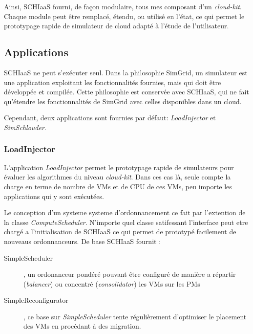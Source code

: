 \documentclass[parallelisme]{compas2017}
\begin{document}
Ainsi, SCHIaaS fourni, de façon modulaire, tous mes composant d'un \textit{cloud-kit}. 
Chaque module peut être remplacé, étendu, ou utilisé en l'état, ce qui permet le prototypage
rapide de simulateur de cloud adapté à l'étude de l'utilisateur.

\subsection{Applications}

SCHIaaS ne peut s'exécuter seul. Dans la philosophie SimGrid, un simulateur est une application
exploitant les fonctionnalités fournies, mais qui doit être développée et compilée.
Cette philosophie est conservée avec SCHIaaS, qui ne fait qu'étendre les fonctionnalités de 
SimGrid avec celles disponibles dans un cloud.

Cependant, deux applications sont fournies par défaut: \emph{LoadInjector} et \emph{SimSchlouder}.

\subsubsection{LoadInjector}

L'application \emph{LoadInjector} permet le prototypage rapide de simulateurs
pour évaluer les algorithmes du niveau \textit{cloud-kit}. Dans ces cas là,
seule compte la charge en terme de nombre de VMs et de CPU de ces VMs, peu
importe les applications qui y sont exécutées.

Le conception d'un systeme systeme d'ordonnancement ce fait par l'extention de
la classe \emph{ComputeScheduler}. N'importe quel classe satifessant l'interface
peut etre chargé a l'initialisation de SCHIaaS ce qui permet de prototypé
facilement de nouveaus ordonnanceurs. De base SCHIaaS fournit : 
\begin{description}
	\item[SimpleScheduler], un ordonanceur pondéré pouvant être configuré de
		manière a répartir (\emph{balancer}) ou concentré
		(\emph{consolidator}) les VMs sur les PMs
	\item[SimpleReconfigurator], ce base sur \emph{SimpleScheduler} tente
		régulièrement d'optimiser le placement des VMs en procédant à
		des migration.
\end{description}
\end{document}
